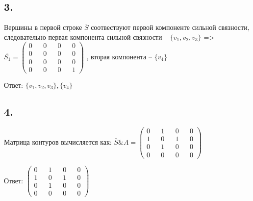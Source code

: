 \documentclass{article}
\begin{document}
\subsection*{3.}
Вершины в первой строке $\overline{S}$ соотвествуют первой компоненте сильной связности,
следовательно первая компонента сильной связности -- $\{v_1, v_2, v_3\}$ =>
$
\overline{S_1}
=
\begin{pmatrix}
  0 && 0 && 0 && 0 \\
  0 && 0 && 0 && 0 \\
  0 && 0 && 0 && 0 \\
  0 && 0 && 0 && 1
\end{pmatrix}
$
, вторая компонента -- $\{v_4\}$

Ответ:
$
\{v_1, v_2, v_3\}, \{v_4\}
$

\subsection*{4.}
Матрица контуров вычисляется как:
$
\overline{S} \& A
=
\begin{pmatrix}
  0 && 1 && 0 && 0 \\
  1 && 0 && 1 && 0 \\
  0 && 1 && 0 && 0 \\
  0 && 0 && 0 && 0
\end{pmatrix}
$

Ответ:
$
\begin{pmatrix}
  0 && 1 && 0 && 0 \\
  1 && 0 && 1 && 0 \\
  0 && 1 && 0 && 0 \\
  0 && 0 && 0 && 0
\end{pmatrix}
$
\end{document}
